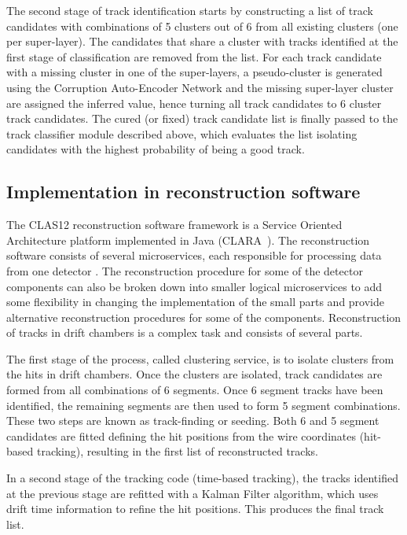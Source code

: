 \documentclass[aps,prl,preprint,12pt]{elsarticle}
\begin{document}
The second stage of track identification starts by constructing a list of track candidates with combinations 
of 5 clusters out of 6 from all existing clusters (one per super-layer). The candidates that share a cluster with 
tracks identified at the first stage of classification are removed from the list. For each track candidate with a 
missing cluster in one of the super-layers, a pseudo-cluster is generated using the Corruption Auto-Encoder 
Network and the missing super-layer cluster are assigned the inferred value, hence turning all track candidates 
to 6 cluster track candidates. The cured (or fixed) track candidate list is finally passed to the track classifier 
module described above, which evaluates the list isolating candidates with the highest probability of being a 
good track. 

\subsection{Implementation in reconstruction software}

The CLAS12 reconstruction software framework is a Service Oriented Architecture platform implemented in Java (CLARA~\cite{Gyurjyan:2011zz}).
The reconstruction software consists of several microservices, each responsible for processing data from one
detector \cite{Ziegler:2020gsr}. The reconstruction procedure for some of the detector components can also 
be broken down into smaller logical microservices to add some flexibility in changing the implementation of 
the small parts and provide alternative reconstruction procedures for some of the components. Reconstruction 
of tracks in drift chambers is a complex task and consists of several parts.

The first stage of the process, called clustering service, is to isolate clusters from the hits in drift chambers. 
Once the clusters are isolated, track candidates are formed from all combinations of 6 segments. Once 6 
segment tracks have been identified, the remaining segments are then used to form 5 segment combinations. 
These two steps are known as track-finding or seeding. Both 6 and 5 segment candidates are fitted defining 
the hit positions from the wire coordinates (hit-based tracking), resulting in the first list of reconstructed tracks.

In a second stage of the tracking code (time-based tracking), the tracks identified at the previous stage are 
refitted with a Kalman Filter algorithm, which uses drift time information to refine the hit positions. This 
produces the final track list.
\end{document}
